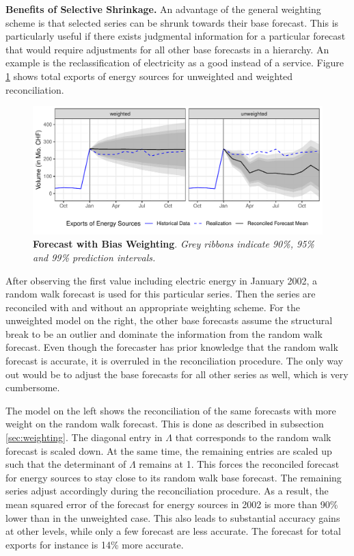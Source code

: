 \documentclass[a4paper,fleqn,11pt]{article}
\begin{document}
\noindent\textbf{Benefits of Selective Shrinkage.} An advantage of the general weighting scheme is that selected series can be shrunk towards their base forecast. This is particularly useful if there exists judgmental information for a particular forecast that would require adjustments for all other base forecasts in a hierarchy. An example is the reclassification of electricity as a good instead of a service. Figure \ref{fig:fcex} shows total exports of energy sources for unweighted and weighted reconciliation.
\begin{figure}[H]
	\includegraphics[width=\textwidth]{fig/fig_electricity}
	\caption[Forecast with Bias Weighting]{\textbf{Forecast with Bias Weighting}. \textit{Grey ribbons indicate 90\%, 95\% and 99\% prediction intervals.}}\label{fig:fcex}
\end{figure}
After observing the first value including electric energy in January 2002, a random walk forecast is used for this particular series. Then the series are reconciled with and without an appropriate weighting scheme. For the unweighted model on the right, the other base forecasts assume the structural break to be an outlier and dominate the information from the random walk forecast. Even though the forecaster has prior knowledge that the random walk forecast is accurate, it is overruled in the reconciliation procedure. The only way out would be to adjust the base forecasts for all other series as well, which is very cumbersome.

The model on the left shows the reconciliation of the same forecasts with more weight on the random walk forecast. This is done as described in subsection \ref{sec:weighting}. The diagonal entry in $\Lambda$ that corresponds to the random walk forecast is scaled down. At the same time, the remaining entries are scaled up such that the determinant of $\Lambda$ remains at 1. This forces the reconciled forecast for energy sources to stay close to its random walk base forecast. The remaining series adjust accordingly during the reconciliation procedure. As a result, the mean squared error of the forecast for energy sources in 2002 is more than 90\% lower than in the unweighted case. This also leads to substantial accuracy gains at other levels, while only a few forecast are less accurate. The forecast for total exports for instance is 14\% more accurate.
\end{document}
